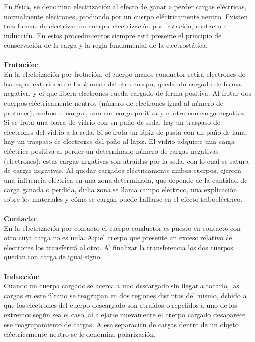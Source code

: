 \documentclass[11pt,a4paper]{article}
\begin{document}
En f\'{i}sica, se denomina electrizaci\'{o}n al efecto de ganar o perder cargas el\'{e}ctricas, normalmente electrones, producido por un cuerpo el\'{e}ctricamente neutro. Existen tres formas de electrizar un cuerpo: electrizaci\'{o}n por frotaci\'{o}n, contacto e inducci\'{o}n. En estos procedimientos siempre est\'{a} presente el principio de conservaci\'{o}n de la carga y la regla fundamental de la electrost\'{a}tica.
\\
\\
\textbf{Frotaci\'{o}n}:\\
En la electrizaci\'{o}n por frotaci\'{o}n, el cuerpo menos conductor retira electrones de las capas exteriores de los \'{a}tomos del otro cuerpo, quedando cargado de forma negativa, y el que libera electrones queda cargado de forma positiva. Al frotar dos cuerpos el\'{e}ctricamente neutros (n\'{u}mero de electrones igual al n\'{u}mero de protones), ambos se cargan, uno con carga positiva y el otro con carga negativa. Si se frota una barra de vidrio con un pa\~{n}o de seda, hay un traspaso de electrones del vidrio a la seda. Si se frota un l\'{a}piz de pasta con un pa\~{n}o de lana, hay un traspaso de electrones del pa\~{n}o al l\'{a}piz. El vidrio adquiere una carga el\'{e}ctrica positiva al perder un determinado n\'{u}mero de cargas negativas (electrones); estas cargas negativas son atra\'{i}das por la seda, con lo cual se satura de cargas negativas. Al quedar cargados el\'{e}ctricamente ambos cuerpos, ejercen una influencia el\'{e}ctrica en una zona determinada, que depende de la cantidad de carga ganada o perdida, dicha zona se llama campo el\'{e}ctrico, una explicaci\'{o}n sobre los materiales y c\'{o}mo se cargan puede hallarse en el efecto triboel\'{e}ctrico.
\\
\\
\textbf{Contacto}:\\
En la electrizaci\'{o}n por contacto el cuerpo conductor es puesto en contacto con otro cuya carga no es nula. Aquel cuerpo que presente un exceso relativo de electrones los transferir\'{a} al otro. Al finalizar la transferencia los dos cuerpos quedan con carga de igual signo.
\\
\\
\textbf{Inducci\'{o}n}:\\
Cuando un cuerpo cargado se acerca a uno descargado sin llegar a tocarlo, las cargas en este \'{u}ltimo se reagrupan en dos regiones distintas del mismo, debido a que los electrones del cuerpo descargado son atra\'{i}dos o repelidos a uno de los extremos seg\'{u}n sea el caso, al alejarse nuevamente el cuerpo cargado desaparece ese reagrupamiento de cargas. A esa separaci\'{o}n de cargas dentro de un objeto el\'{e}ctricamente neutro se le denomina polarizaci\'{o}n.
\end{document}
